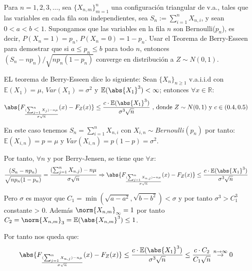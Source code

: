 \begin{problem}[9] Para $n=1, 2, 3, \dots$, sea  $\{X_{n,m}\}_{m=1}^{n}$  una configuraci\'on triangular de v.a., tales que las variables en cada fila son independientes, sea $S_{n} := \sum_{i=1}^n X_{n,i}$, y sean $0 < a < b < 1$. Supongamos que las
variables en la fila $n$ son Bernoulli($p_n$), es decir, $P(X_n = 1) = p_n$, $P(X_n = 0) = 1 - p_n$.
Usar el Teorema de Berry-Esseen para demostrar que si $a \le p_n \le b$ para todo $n$,
entonces $(S_n - n p_n)/\sqrt{n p_n (1 - p_n)}$ converge en distribuci\'on a $Z\sim N(0,1)$.
\solution

EL teorema de Berry-Esseen dice lo siguiente:
Sean $\{X_n\}_{n\geq 1}$ v.a.i.i.d con $\mathbb{E}(X_1)=\mu$, $Var(X_1)=\sigma^2$ y $\mathbb{E}(\abs{X_1}^3)<\infty$; entonces $\forall x \in \mathbb{R}$:
\[
\abs{F_{\frac{(\sum_{j=1}^{n}X_j)-n\mu}{\sigma \sqrt{n}}}(x)-F_Z(x)} \leq \frac{c\cdot \mathbb{E}(\abs{X_1}^3)}{\sigma^3\sqrt{n}} \text{ , donde $Z\sim N(0,1)$ y $c\in (0.4,0.5)$}
\]

En este caso tenemos $S_n = \sum_{i=1}^{n}X_{n,i}$ con $X_{i,n} \sim Bernoulli(p_n)$ por tanto: $\mathbb{E}(X_{i,n})=p=\mu$ y $Var(X_{i,n})=p(1-p)=\sigma^2$.

Por tanto, $\forall n$ y por Berry-Jensen, se tiene que $
\forall x$:
\[
\frac{(S_n - n p_n)}{\sqrt{n p_n (1 - p_n)}} = \frac{(\sum_{j=1}^{n}X_{n,j})-n\mu}{\sigma \sqrt{n}} \Rightarrow \abs{F_{\frac{(\sum_{j=1}^{n}X_{n,j})-n\mu}{\sigma \sqrt{n}}}(x)-F_Z(x)} \leq \frac{c\cdot \mathbb{E}(\abs{X_1}^3)}{\sigma^3\sqrt{n}}
\]

Pero $\sigma$ es mayor que $C_1=\min(\sqrt{a-a^2},\sqrt{b-b^2}) < \sigma$ y por tanto $\sigma^3 > C_1^3$ constante > 0. Además $\norm{X_{n,m}}_{\infty}=1$ por tanto $C_2=\norm{X_{n,m}}_3=\mathbb{E}(\abs{X_{n,m}}^3) \leq 1$.

Por tanto nos queda que:
\[
\abs{F_{\frac{(\sum_{j=1}^{n}X_{n,j})-n\mu}{\sigma \sqrt{n}}}(x)-F_Z(x)} \leq \frac{c\cdot \mathbb{E}(\abs{X_1}^3)}{\sigma^3\sqrt{n}} \leq  \frac{c\cdot C_2}{C_1\sqrt{n}} \stackrel{n \rightarrow \infty}{\rightarrow} 0
\]

\end{problem}


